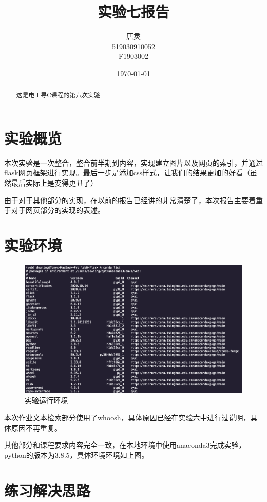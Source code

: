 \documentclass[UTF8]{ctexart}
\title{实验七报告}
\author{唐灵\\519030910052\\F1903002}
\date{\today}
\begin{document}
    \maketitle
    \begin{abstract}
        这是电工导C课程的第六次实验
    \end{abstract}
    \section{实验概览}
        本次实验是一次整合，整合前半期到内容，实现建立图片以及网页的索引，并通过flask网页框架进行实现。最后一步是添加css样式，让我们的结果更加的好看（虽然最后实际上是变得更丑了）

        由于对于其他部分的实现，在以前的报告已经讲的非常清楚了，本次报告主要着重于对于网页部分的实现的表述。
    \section{实验环境}

        \begin{figure}[ht]
            \centering
            \includegraphics[scale=0.15]{img/env.png}
            \caption{实验运行环境}
        \end{figure} 
        本次作业文本检索部分使用了whoosh，具体原因已经在实验六中进行过说明，具体原因不再重复。
        
        其他部分和课程要求内容完全一致，在本地环境中使用anaconda3完成实验，
        python的版本为3.8.5，具体环境环境如上图。     

    \section{练习解决思路}
\end{document}
